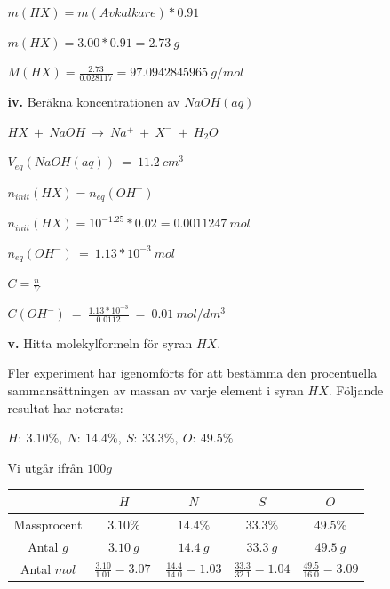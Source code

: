 \documentclass[12pt, letterpaper, twoside]{article}
\begin{document}
\begin{flushleft}
\begin{itemize}
\begin{itemize}
$ m(HX)=m(Avkalkare)*0.91 $

$ m(HX)=3.00*0.91=2.73\ g $

$ M(HX)=\frac{2.73}{0.028117}=97.0942845965\ g/mol $

\hfill
\item[\textbf{iv.}] Beräkna koncentrationen av $ NaOH(aq) $

$ HX\ +\ NaOH\ \rightarrow\ Na^+\ +\ X^-\ +\ H_2O $

$ V_{eq}(NaOH(aq))\ =\ 11.2\ cm^3 $

$ n_{init}(HX)=n_{eq}(OH^-) $

$ n_{init}(HX)= 10^{-1.25}*0.02=0.0011247\ mol $

$ n_{eq}(OH^-)\ =\ 1.13*10^{-3}\ mol $

$ C=\frac{n}{V} $

$ C(OH^-)\ =\ \frac{1.13*10^{-3}}{0.0112}\ =\ 0.01\ mol/dm^3 $

\hfill
\item[\textbf{v.}] Hitta molekylformeln för syran $ HX $.

\hfill

Fler experiment har igenomförts för att bestämma den procentuella sammansättningen
av massan av varje element i syran $ HX $. Följande resultat har noterats:\\

\hfill

$ H:\ 3.10\%,\ N:\ 14.4\%,\ S:\ 33.3\%,\ O:\ 49.5\% $



Vi utgår ifrån $ 100 g $

\renewcommand{\arraystretch}{1.5}
\begin{tabular}{ |c|c|c|c|c| }
 \hline
  & $ H $ & $ N $ & $ S $ & $ O $ \\
 \hline
 Massprocent & $ 3.10\% $ & $ 14.4\% $ & $ 33.3\% $ & $ 49.5\% $ \\
 \hline
 Antal $ g $ & $ 3.10\ g $ & $ 14.4\ g $ & $ 33.3\ g $ & $ 49.5\ g $ \\
 \hline
 Antal $ mol $ & $ \frac{3.10}{1.01}=3.07\ $ & $ \frac{14.4}{14.0}=1.03 $ & $ \frac{33.3}{32.1}=1.04 $ & $ \frac{49.5}{16.0}=3.09 $ \\
 \hline
\end{tabular}



\end{itemize}
\end{itemize}
\end{flushleft}
\end{document}
